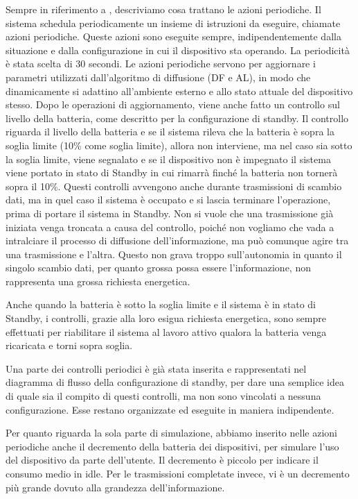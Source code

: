Sempre in riferimento a , descriviamo cosa trattano le azioni periodiche. Il sistema schedula periodicamente un insieme di istruzioni da eseguire, chiamate azioni periodiche. Queste azioni sono eseguite sempre, indipendentemente dalla situazione e dalla configurazione in cui il dispositivo sta operando. La periodicità è stata scelta di 30 secondi. Le azioni periodiche servono per aggiornare i parametri utilizzati dall'algoritmo di diffusione (\acs{DF} e \acs{AL}), in modo che dinamicamente si adattino all'ambiente esterno e allo stato attuale del dispositivo stesso. Dopo le operazioni di aggiornamento, viene anche fatto un controllo sul livello della batteria, come descritto per la configurazione di standby. Il controllo riguarda il livello della batteria e se il sistema rileva che la batteria è sopra la soglia limite (10\% come soglia limite), allora non interviene, ma nel caso sia sotto la soglia limite, viene segnalato e se il dispositivo non è impegnato il sistema viene portato in stato di Standby in cui rimarrà finché la batteria non tornerà sopra il 10\%. Questi controlli avvengono anche durante trasmissioni di scambio dati, ma in quel caso il sistema è occupato e si lascia terminare l'operazione, prima di portare il sistema in Standby. Non si vuole che una trasmissione già iniziata venga troncata a causa del controllo, poiché non vogliamo che vada a intralciare il processo di diffusione dell'informazione, ma può comunque agire tra una trasmissione e l'altra. Questo non grava troppo sull'autonomia in quanto il singolo scambio dati, per quanto grossa possa essere l'informazione, non rappresenta una grossa richiesta energetica. 

Anche quando la batteria è sotto la soglia limite e il sistema è in stato di Standby, i controlli, grazie alla loro esigua richiesta energetica, sono sempre effettuati per riabilitare il sistema al lavoro attivo qualora la batteria venga ricaricata e torni sopra soglia.

Una parte dei controlli periodici è già stata inserita e rappresentati nel diagramma di flusso della configurazione di standby, per dare una semplice idea di quale sia il compito di questi controlli, ma non sono vincolati a nessuna configurazione. Esse restano organizzate ed eseguite in maniera indipendente.

Per quanto riguarda la sola parte di simulazione, abbiamo inserito nelle azioni periodiche anche il decremento della batteria dei dispositivi, per simulare l'uso del dispositivo da parte dell'utente. Il decremento è piccolo per indicare il consumo medio in idle. Per le trasmissioni completate invece, vi è un decremento più grande dovuto alla grandezza dell'informazione.
\bigskip

